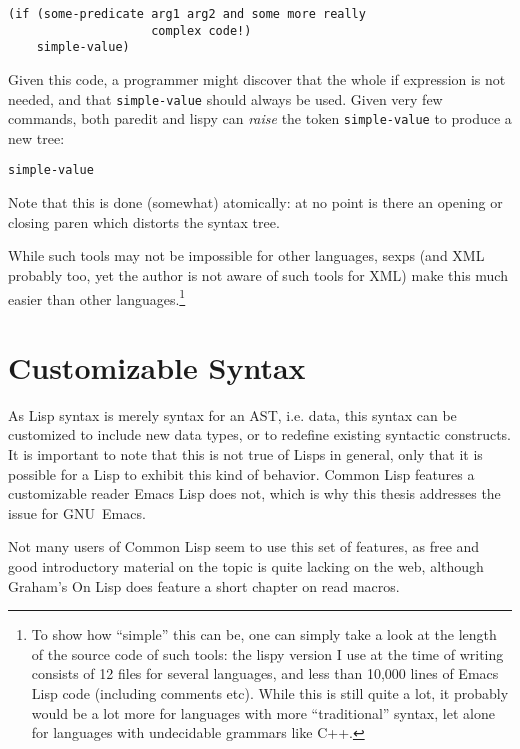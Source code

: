 \documentclass[a4paper,10pt,twoside]{report}
\newcommand{\el}{Emacs Lisp}
\newcommand{\cl}{Common Lisp}
\newcommand{\sym}[1]{\texttt{#1}}
\newcommand{\emacs}{GNU~Emacs}
\begin{document}
\begin{lstlisting}[style=lispinline]
(if (some-predicate arg1 arg2 and some more really
                    complex code!)
    simple-value)
\end{lstlisting}

Given this code, a programmer might discover that the whole if expression is not
needed, and that \sym{simple-value} should always be used.  Given very few
commands, both paredit and lispy can \emph{raise} the token \sym{simple-value}
to produce a new tree:

\begin{lstlisting}[style=lispinline]
simple-value
\end{lstlisting}

Note that this is done (somewhat) atomically: at no point is there an opening or
closing paren which distorts the syntax tree.

While such tools may not be impossible for other languages, sexps (and XML
probably too, yet the author is not aware of such tools for XML) make this much
easier than other languages.\footnote{To show how ``simple'' this can be, one
  can simply take a look at the length of the source code of such tools: the
  lispy version I use at the time of writing consists of 12 files for several
  languages, and less than 10,000 lines of \el{} code (including comments etc).
  While this is still quite a lot, it probably would be a lot more for languages
  with more ``traditional'' syntax, let alone for languages with undecidable
  grammars like C++.}

\section{Customizable Syntax}
\label{subsec:custom-syntax}

As Lisp syntax is merely syntax for an AST, i.e. data, this syntax can be
customized to include new data types, or to redefine existing syntactic
constructs.  It is important to note that this is not true of Lisps in general,
only that it is possible for a Lisp to exhibit this kind of behavior.  \cl{}
features a customizable reader \el{} does not, which is why this thesis
addresses the issue for \emacs{}.

Not many users of \cl{} seem to use this set of features, as free and good
introductory material on the topic is quite lacking on the web, although
Graham’s On Lisp \cite{on-lisp} does feature a short chapter on read
macros.
\end{document}
